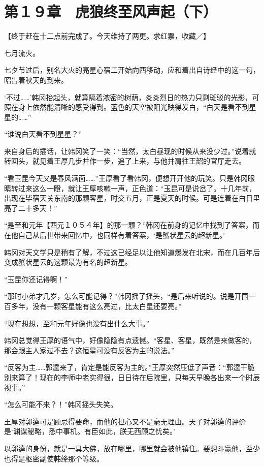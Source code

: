 \section{第１９章　虎狼终至风声起（下）}

【终于赶在十二点前完成了。今天维持了两更。求红票，收藏／】

七月流火。

七夕节过后，别名大火的亮星心宿二开始向西移动，应和着出自诗经中的这一句，昭告着秋天的到来。

‘不过……’韩冈抬起头，就算隔着浓密的树荫，炎炎烈日的热力只剩斑驳的光影，可照在身上依然能清晰的感受得到。蓝色的天空被阳光映得发白，“白天是看不到星星的……”

“谁说白天看不到星星？”

来自身后的插话，让韩冈笑了一笑：“当然，太白昼现的时候从来没少过。”说着就转回头，就见着王厚几步并作一步，追了上来，与他并肩往王韶的官厅走去。

“看玉昆今天又是春风满面……”王厚看了看韩冈，便想开开他的玩笑。只是韩冈眼睛转过来这么一瞪，就让王厚咳嗽一声，正色道：“玉昆可是说岔了。十几年前，出现在毕宿天关东南的那颗客星，时交五月，正是夏天的时候。可是连着在白日里亮了二十多天！”

“是至和元年【西元１０５４年】的那一颗？”韩冈在前身的记忆中找到了答案，而在他自己从后世带来回忆中，也同样有着答案，‘是蟹状星云的超新星。’

韩冈对天文学只是稍有了解，不过这已经足以让他知道爆发在北宋，而在几百年后变成蟹状星云的这颗最为有名的超新星。

“玉昆你还记得啊！”

“那时小弟才几岁，怎么可能记得？”韩冈摇了摇头，“是后来听说的。说是开国一百多年，没有一颗客星能有这么亮过，比太白星还要亮。”

“现在想想，至和元年好像也没有出什么大事。”

韩冈总觉得王厚的语气中，好像隐隐有点遗憾。“客星、客星，既然是来做客的，那会跟主人家过不去？这恒星可没有反客为主的说法。”

“反客为主……郭逵来了，肯定是能反客为主的。”王厚突然压低了声音：“郭逵干脆别来算了！现在的李师中老实得很，日日待在后院里，只每天早晚各出来一个时辰视事。”

“怎么可能不来？！”韩冈摇头失笑。

王厚对郭逵可是顾忌得要命，而他的担心又不是毫无理由。天子对郭逵的评价是‘渊谋秘略，悉中事机。有臣如此，朕无西顾之忧矣。’

以郭逵的身份，就是一具大佛，放在哪里，哪里就会被他镇住。要想斗赢他，至少也得是枢密副使韩绛那个等级。

